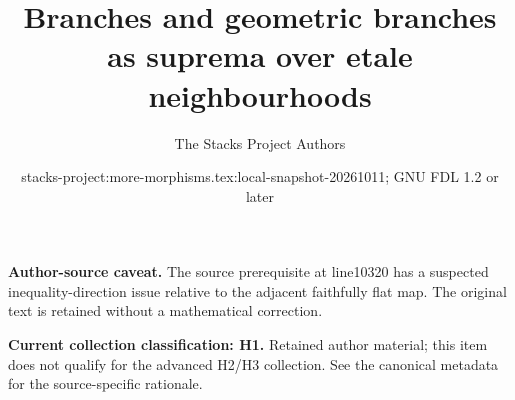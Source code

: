 \documentclass[10pt,a4paper]{amsart}
\title{Branches and geometric branches as suprema over etale neighbourhoods}
\author{The Stacks Project Authors}
\date{stacks-project:more-morphisms.tex:local-snapshot-20261011; GNU FDL 1.2 or later}
\theoremstyle{plain}
\theoremstyle{definition}
\theoremstyle{remark}
\numberwithin{equation}{subsection}
\begin{document}
\maketitle
\par\medskip\noindent\textbf{Author-source caveat.} The source prerequisite at line10320 has a suspected inequality-direction issue relative to the adjacent faithfully flat map. The original text is retained without a mathematical correction.\par\medskip

\par\medskip\noindent\textbf{Current collection classification: H1.} Retained author material; this item does not qualify for the advanced H2/H3 collection. See the canonical metadata for the source-specific rationale.\par\medskip
\end{document}
